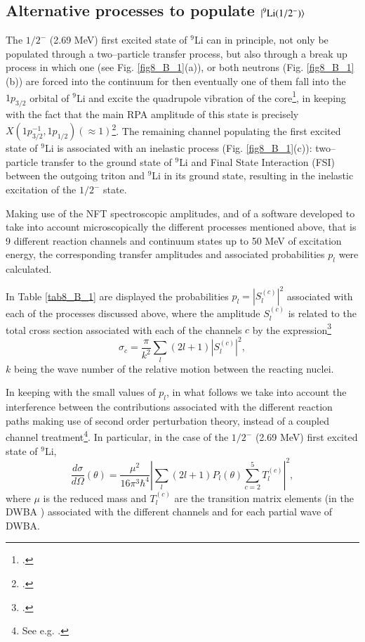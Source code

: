 \begin{subappendices}
\section{Alternative processes to populate $|{^9\text{Li}(1/2^-)} \rangle$}\label{C8AppB}
The $1/2^-$ (2.69 MeV) first excited state of $^9$Li can in principle, not only be populated through a two--particle transfer process, but also through a break up process in which one (see Fig. \ref{fig8_B_1}(a)), or both neutrons (Fig. \ref{fig8_B_1}(b)) are forced into the continuum for then eventually one of them fall into the $1p_{3/2}$ orbital of $^9$Li and excite the quadrupole vibration of the core\footnote{\cite{Potel:10}.}, in keeping with the fact that the main RPA amplitude of this state is precisely $X(1p^{-1}_{3/2},1p_{1/2})(\approx 1)$\footnote{\cite{Barranco:01}.}. The remaining channel populating the first excited state of $^9$Li is associated with an inelastic process (Fig. \ref{fig8_B_1}(c)): two--particle transfer to the ground state of $^{9}$Li and Final State Interaction (FSI) between the outgoing triton and $^{9}$Li in its ground state, resulting in the inelastic excitation of  the $1/2^-$ state.


Making use of the NFT spectroscopic amplitudes, and of a software developed  to take into account microscopically  the different processes mentioned above, that is 9 different reaction channels and continuum states up to 50 MeV of excitation energy, the corresponding transfer amplitudes and associated probabilities $p_l$ were calculated.


 In Table \ref{tab8_B_1} are displayed the probabilities $p_l=|S_l^{(c)}|^2$ associated with each of the processes discussed above, where the amplitude $S_l^{(c)}$ is related to the total cross section associated with each of the channels $c$  by the expression\footnote{\cite{Satchler:80,Landau:81}.}
\begin{equation}\label{eq6}
    \sigma_c=\frac{\pi}{k^2}\sum_l(2l+1)|S_l^{(c)}|^2,
\end{equation}
$k$ being the wave number of the relative motion between the reacting nuclei.



 In keeping with the small values of $p_l$, in what follows we take into account the interference between the contributions associated with the different reaction paths making use of second order perturbation theory, instead of a coupled channel treatment\footnote{See e.g.  \cite{Ascuitto:69} \cite{Tamura:70} \cite{Khoa:04} \cite{Keeley:07b} \cite{Thompson:88}.}. In particular, in the case of the $1/2^-$ (2.69 MeV) first excited state of $^9$Li,
\begin{equation}
    \frac{d\sigma}{d\Omega}(\theta)=\frac{\mu^2}{16\pi^3\hbar^4}\left|\sum_l(2l+1)P_l(\theta)\sum_{c=2}^5 T^{(c)}_l\right|^2,
\end{equation}
where $\mu$ is the reduced mass and $T^{(c)}_l$ are the transition matrix elements (in the DWBA \cite{Satchler:80}) associated with the different channels and for each partial wave of DWBA.


\end{subappendices}
